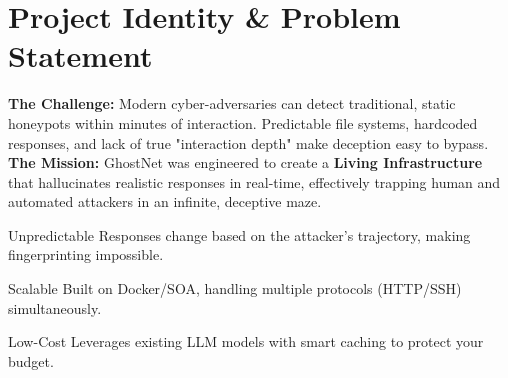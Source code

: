 \documentclass[11pt,a4paper,oneside]{article}
\begin{document}
\begin{center}
    \vspace{0.8cm}
\end{center}

\section{Project Identity \& Problem Statement}
\begin{tcolorbox}[colback=GhostWhite, colframe=NavyDark, boxrule=0.5pt, arc=3mm]
    \textbf{The Challenge:} Modern cyber-adversaries can detect traditional, static honeypots within minutes of interaction. Predictable file systems, hardcoded responses, and lack of true "interaction depth" make deception easy to bypass. \\
    \textbf{The Mission:} GhostNet was engineered to create a \textbf{Living Infrastructure} that hallucinates realistic responses in real-time, effectively trapping human and automated attackers in an infinite, deceptive maze.
\end{tcolorbox}

\begin{tcbraster}[raster columns=3, raster gutter=4mm]
    \begin{conceptcard}{\linewidth}{Unpredictable}
        Responses change based on the attacker's trajectory, making fingerprinting impossible.
    \end{conceptcard}
    \begin{conceptcard}{\linewidth}{Scalable}
        Built on Docker/SOA, handling multiple protocols (HTTP/SSH) simultaneously.
    \end{conceptcard}
    \begin{conceptcard}{\linewidth}{Low-Cost}
        Leverages existing LLM models with smart caching to protect your budget.
    \end{conceptcard}
\end{tcbraster}
\end{document}
